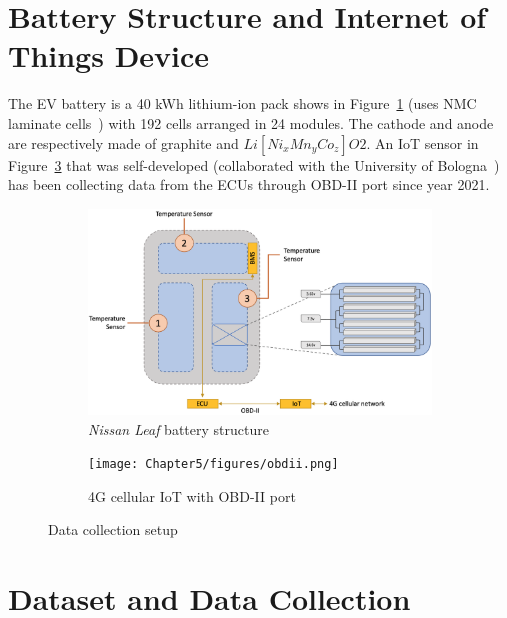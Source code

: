 \section{Battery Structure and Internet of Things Device}
\label{sec:thermal_dynamics_case_study_intro}

The \gls{EV} battery is a 40 kWh lithium-ion pack shows in Figure~\ref{fig:leaf_bat_pack} (uses \gls{NMC} laminate cells~\cite{calearo2019modeling}) with 192 cells arranged in 24 modules. 
The cathode and anode are respectively made of graphite and $Li[Ni_xMn_yCo_z]O2$. 
An \gls{IoT} sensor in Figure~\ref{fig:colletion_setup} that was self-developed (collaborated with the University of Bologna~\cite{CCNC_2022}) has been collecting data from the \glspl{ECU} through \gls{OBD-II} port since year 2021. 


\begin{figure} [htbp]
	\centering
	\begin{subfigure}{0.45\linewidth}
		\includegraphics[width=\linewidth]{Chapter5/figures/leaf_pack_temp_sensor.png}
		\caption{\textit{Nissan Leaf} battery structure~\cite{kane_2020_see}}
        \label{fig:leaf_bat_pack}
	\end{subfigure}
	\quad
    \begin{subfigure}{0.42\linewidth}
		\texttt{[image: Chapter5/figures/obdii.png]}
		\caption{4G cellular \gls{IoT} with \gls{OBD-II} port}
        \label{fig:colletion_setup}
	\end{subfigure}
    \caption{Data collection setup}
\end{figure}

\section{Dataset and Data Collection}

